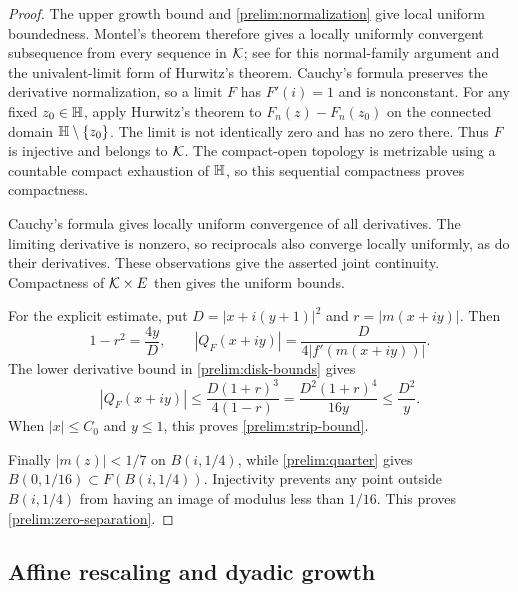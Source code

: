 \begin{proof}
The upper growth bound and \eqref{prelim:normalization} give local uniform
boundedness.  Montel's theorem therefore gives a locally uniformly
convergent subsequence from every sequence in $\mathcal K$; see
\cite[Sections~1.1 and~1.3]{Duren1983} for this normal-family argument and
the univalent-limit form of Hurwitz's theorem.  Cauchy's formula preserves
the derivative normalization, so a limit $F$ has $F'(i)=1$ and is
nonconstant.  For any fixed $z_0\in\mathbb H$, apply Hurwitz's theorem to
$F_n(z)-F_n(z_0)$ on the connected domain $\mathbb H\setminus\{z_0\}$.
The limit is not identically zero and has no zero there.  Thus $F$ is
injective and belongs to $\mathcal K$.  The compact-open topology is metrizable
using a countable compact exhaustion of $\mathbb H$, so this sequential
compactness proves compactness.

Cauchy's formula gives locally uniform convergence of all derivatives.
The limiting derivative is nonzero, so reciprocals also converge locally
uniformly, as do their derivatives.  These observations give the asserted
joint continuity.  Compactness of $\mathcal K\times E$ then gives the uniform
bounds.

For the explicit estimate, put $D=|x+i(y+1)|^2$ and $r=|m(x+iy)|$.
Then
\[
 1-r^2=\frac{4y}{D},\qquad
 |Q_F(x+iy)|=\frac{D}{4|f'(m(x+iy))|}.
\]
The lower derivative bound in \eqref{prelim:disk-bounds} gives
\[
 |Q_F(x+iy)|
 \le\frac{D(1+r)^3}{4(1-r)}
 =\frac{D^2(1+r)^4}{16y}
 \le\frac{D^2}{y}.
\]
When $|x|\le C_0$ and $y\le1$, this proves
\eqref{prelim:strip-bound}.

Finally $|m(z)|<1/7$ on $B(i,1/4)$, while
\eqref{prelim:quarter} gives
$B(0,1/16)\subset F(B(i,1/4))$.  Injectivity prevents any point outside
$B(i,1/4)$ from having an image of modulus less than $1/16$.  This proves
\eqref{prelim:zero-separation}.
\end{proof}

\subsection{Affine rescaling and dyadic growth}

